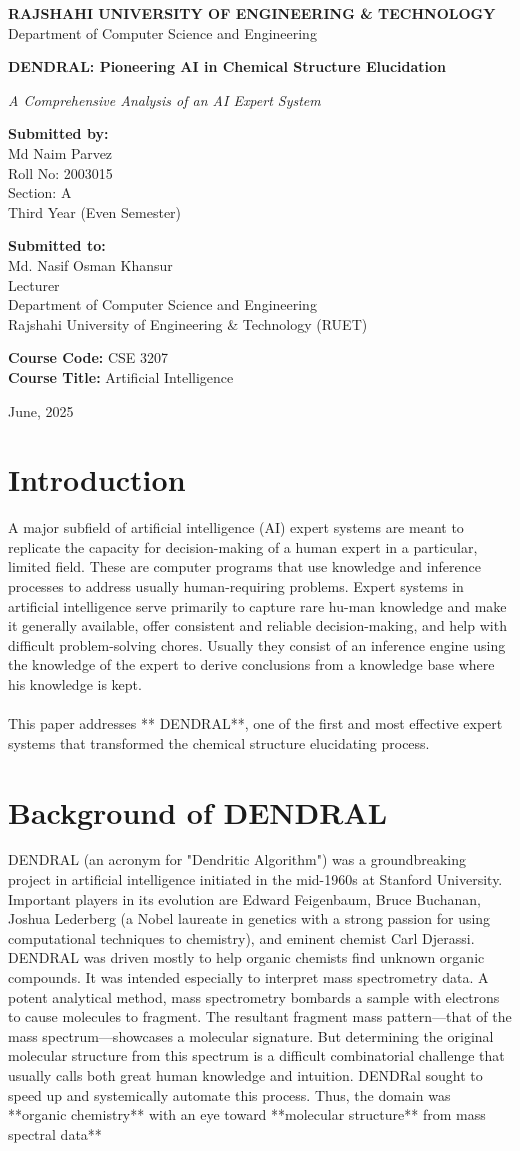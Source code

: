 \documentclass[12pt,a4paper]{article}
\newcommand{\maketitlepage}{
    \begin{titlepage}
        \centering
        \vspace*{0.5cm}
        {\Huge \textbf{RAJSHAHI UNIVERSITY OF ENGINEERING \& TECHNOLOGY}} %
        \vspace*{0.5cm}
        {\Large Department of Computer Science and Engineering}
        
        \vspace*{2.5cm} %
        
        {\huge\bfseries DENDRAL: Pioneering AI in Chemical Structure Elucidation\par}
        \vspace{0.5cm}
        {\Large \textit{A Comprehensive Analysis of an AI Expert System}\par}
        
        \vspace{2cm} %
        
        \begin{flushleft}
        \large \textbf{Submitted by:}\\
        \large Md Naim Parvez \\ %
        \large Roll No: 2003015 \\ %
        \large Section: A \\ %
        \large Third Year (Even Semester) \\
        \end{flushleft}
        
        \vspace{1cm} %
        
        \begin{flushleft}
        \large \textbf{Submitted to:}\\
        \large Md. Nasif Osman Khansur \\ %
        \large Lecturer \\ %
        \large Department of Computer Science and Engineering \\
        \large Rajshahi University of Engineering \& Technology (RUET) \\
        \end{flushleft}
        
        \vspace{1cm}
        {\large \textbf{Course Code:} CSE 3207} \\ %
        {\large \textbf{Course Title:} Artificial Intelligence} %
        
        \vfill %
        
        {\large June, 2025\par} %
    \end{titlepage}
}
\begin{document}
\maketitlepage
\thispagestyle{empty} %

\newpage
{} %
\tableofcontents
\newpage
{} %
\setcounter{page}{1} %


\section{Introduction}
A major subfield of artificial intelligence (AI) expert systems are meant to replicate the capacity for decision-making of a human expert in a particular, limited field. These are computer programs that use knowledge and inference processes to address usually human-requiring problems. Expert systems in artificial intelligence serve primarily to capture rare hu-man knowledge and make it generally available, offer consistent and reliable decision-making, and help with difficult problem-solving chores. Usually they consist of an inference engine using the knowledge of the expert to derive conclusions from a knowledge base where his knowledge is kept.
\\\\This paper addresses ** DENDRAL**, one of the first and most effective expert systems that transformed the chemical structure elucidating process.
\section{Background of DENDRAL}
DENDRAL (an acronym for "Dendritic Algorithm") was a groundbreaking project in artificial intelligence initiated in the mid-1960s at Stanford University. Important players in its evolution are Edward Feigenbaum, Bruce Buchanan, Joshua Lederberg (a Nobel laureate in genetics with a strong passion for using computational techniques to chemistry), and eminent chemist Carl Djerassi.
\\DENDRAL was driven mostly to help organic chemists find unknown organic compounds. It was intended especially to interpret mass spectrometry data.
A potent analytical method, mass spectrometry bombards a sample with electrons to cause molecules to fragment. The resultant fragment mass pattern—that of the mass spectrum—showcases a molecular signature. But determining the original molecular structure from this spectrum is a difficult combinatorial challenge that usually calls both great human knowledge and intuition. DENDRal sought to speed up and systemically automate this process. Thus, the domain was **organic chemistry** with an eye toward **molecular structure** from mass spectral data**
\end{document}
